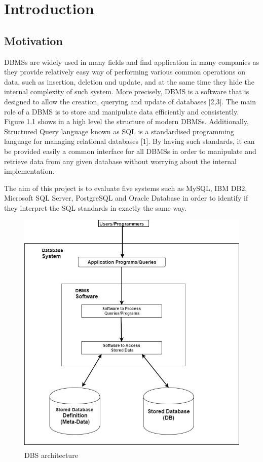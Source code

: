\chapter{Introduction}
 \section{Motivation}


DBMSs are widely used in many fields and find application in many companies as they provide relatively easy way of performing various common operations on data, such as insertion, deletion and update, and at the same time they hide the internal complexity of such  system. More precisely, DBMS is a software that is designed to allow the creation, querying and update of databases [2,3]. The main role of a DBMS is to store and manipulate data efficiently and consistently. Figure 1.1 shows in a high level the structure of modern DBMSs. Additionally, Structured Query language  known as SQL is a standardised programming language for managing relational databases [1]. By having such standards, it can be provided easily a common interface for all DBMSs in order to manipulate and retrieve data from any given database without worrying about the internal implementation. 
 
The aim of this project is to evaluate five systems such as MySQL, IBM DB2, Microsoft SQL Server, PostgreSQL and Oracle Database in order to identify if they interpret the SQL standards in exactly the same way. 

 \begin{figure} 
      \centering
      \includegraphics[width=\textwidth]{Images/db_architecture}
      \caption{DBS architecture}
      \label{fig:counting-methods}
    \end{figure}

